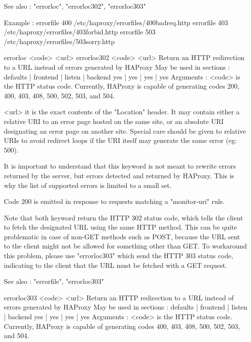   See also : "errorloc", "errorloc302", "errorloc303"

  Example :
        errorfile 400 /etc/haproxy/errorfiles/400badreq.http
        errorfile 403 /etc/haproxy/errorfiles/403forbid.http
        errorfile 503 /etc/haproxy/errorfiles/503sorry.http


errorloc <code> <url>
errorloc302 <code> <url>
  Return an HTTP redirection to a URL instead of errors generated by HAProxy
  May be used in sections :   defaults | frontend | listen | backend
                                 yes   |    yes   |   yes  |   yes
  Arguments :
    <code>    is the HTTP status code. Currently, HAProxy is capable of
              generating codes 200, 400, 403, 408, 500, 502, 503, and 504.

    <url>     it is the exact contents of the "Location" header. It may contain
              either a relative URI to an error page hosted on the same site,
              or an absolute URI designating an error page on another site.
              Special care should be given to relative URIs to avoid redirect
              loops if the URI itself may generate the same error (eg: 500).

  It is important to understand that this keyword is not meant to rewrite
  errors returned by the server, but errors detected and returned by HAProxy.
  This is why the list of supported errors is limited to a small set.

  Code 200 is emitted in response to requests matching a "monitor-uri" rule.

  Note that both keyword return the HTTP 302 status code, which tells the
  client to fetch the designated URL using the same HTTP method. This can be
  quite problematic in case of non-GET methods such as POST, because the URL
  sent to the client might not be allowed for something other than GET. To
  workaround this problem, please use "errorloc303" which send the HTTP 303
  status code, indicating to the client that the URL must be fetched with a GET
  request.

  See also : "errorfile", "errorloc303"


errorloc303 <code> <url>
  Return an HTTP redirection to a URL instead of errors generated by HAProxy
  May be used in sections :   defaults | frontend | listen | backend
                                 yes   |    yes   |   yes  |   yes
  Arguments :
    <code>    is the HTTP status code. Currently, HAProxy is capable of
              generating codes 400, 403, 408, 500, 502, 503, and 504.

